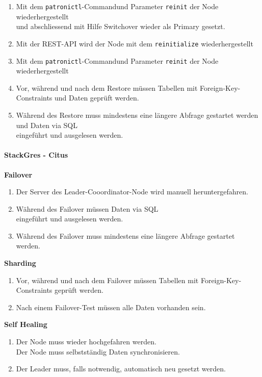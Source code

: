 \begin{flushleft}
\begin{description}
\begin{enumerate}[resume]
            \item Mit dem \texttt{patronictl}-Commandund Parameter \texttt{reinit} der Node wiederhergestellt\\und abschliessend mit Hilfe Switchover wieder als Primary gesetzt.
            \item Mit der REST-API wird der Node mit dem \texttt{reinitialize} wiederhergestellt
            \item Mit dem \texttt{patronictl}-Commandund Parameter \texttt{reinit} der Node wiederhergestellt
            \item Vor, während und nach dem Restore müssen Tabellen mit Foreign-Key-Constraints und Daten geprüft werden.
            \item Während des Restore muss mindestens eine längere Abfrage gestartet werden und Daten via SQL\\eingeführt und ausgelesen werden.
        \end{enumerate}
    \end{description}
    \paragraph{StackGres - Citus}
    \begin{description}
        \item \textbf{Failover}\hfill \\
        \begin{enumerate}
            \item Der Server des Leader-Cooordinator-Node wird manuell heruntergefahren.
            \item Während des Failover müssen Daten via SQL\\eingeführt und ausgelesen werden.
            \item Während des Failover muss mindestens eine längere Abfrage gestartet werden.
        \end{enumerate}
        \item \textbf{Sharding}\hfill \\
        \begin{enumerate}[resume]
            \item Vor, während und nach dem Failover müssen Tabellen mit Foreign-Key-Constraints geprüft werden.
            \item Nach einem Failover-Test müssen alle Daten vorhanden sein.
        \end{enumerate}
        \item \textbf{Self Healing}\hfill \\
        \begin{enumerate}[resume]
            \item Der Node muss wieder hochgefahren werden.\\Der Node muss selbstständig Daten synchronisieren.
            \item Der Leader muss, falls notwendig, automatisch neu gesetzt werden.
        \end{enumerate}
    \end{description}

\end{flushleft}
